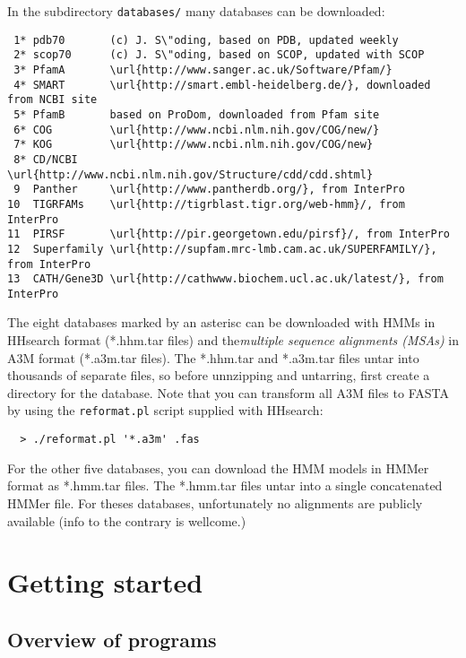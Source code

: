 \documentclass[11pt,a4paper]{article}
\begin{document}
In the subdirectory \verb`databases/` many databases can be downloaded:
\small \begin{verbatim}
 1* pdb70       (c) J. S\"oding, based on PDB, updated weekly
 2* scop70      (c) J. S\"oding, based on SCOP, updated with SCOP
 3* PfamA       \url{http://www.sanger.ac.uk/Software/Pfam/}
 4* SMART       \url{http://smart.embl-heidelberg.de/}, downloaded from NCBI site
 5* PfamB       based on ProDom, downloaded from Pfam site
 6* COG         \url{http://www.ncbi.nlm.nih.gov/COG/new/}
 7* KOG	        \url{http://www.ncbi.nlm.nih.gov/COG/new}
 8* CD/NCBI     \url{http://www.ncbi.nlm.nih.gov/Structure/cdd/cdd.shtml}  	
 9  Panther     \url{http://www.pantherdb.org/}, from InterPro
10  TIGRFAMs    \url{http://tigrblast.tigr.org/web-hmm}/, from InterPro
11  PIRSF       \url{http://pir.georgetown.edu/pirsf}/, from InterPro
12  Superfamily \url{http://supfam.mrc-lmb.cam.ac.uk/SUPERFAMILY/}, from InterPro
13  CATH/Gene3D \url{http://cathwww.biochem.ucl.ac.uk/latest/}, from InterPro 
\end{verbatim} \normalsize

The eight databases marked by an asterisc can be downloaded with HMMs in HHsearch 
format (*.hhm.tar files) and the\emph{multiple sequence alignments (MSAs)} in 
A3M format (*.a3m.tar files). The *.hhm.tar and *.a3m.tar files untar into thousands
of separate files, so before unnzipping and untarring, first create a directory for 
the database. Note that you can transform all A3M files to FASTA by using the 
\verb`reformat.pl` script supplied with HHsearch:
\begin{verbatim}
  > ./reformat.pl '*.a3m' .fas
\end{verbatim}

For the other five databases, you can download the HMM models in HMMer format as 
*.hmm.tar files. The *.hmm.tar files untar into a single concatenated HMMer file. 
For theses databases, unfortunately no alignments are publicly available (info to the 
contrary is wellcome.) 


\section{Getting started}

\subsection{Overview of programs}
\end{document}
